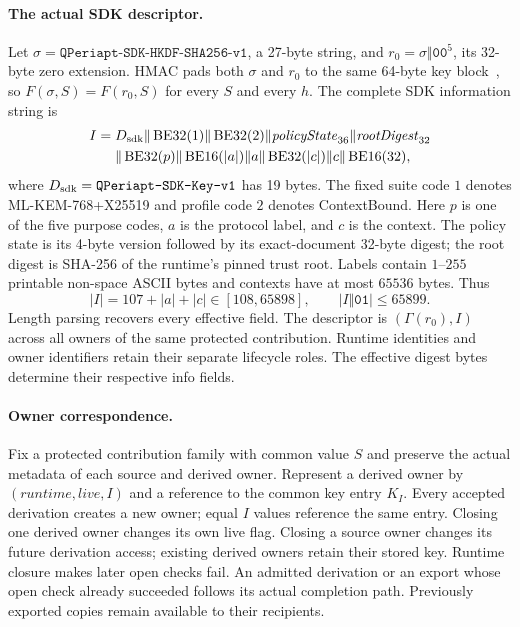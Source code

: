 \paragraph{The actual SDK descriptor.}
Let $\sigma=\texttt{QPeriapt-SDK-HKDF-SHA256-v1}$, a 27-byte string, and
$r_0=\sigma\Vert\mathtt{00}^5$, its 32-byte zero extension. HMAC pads both $\sigma$ and $r_0$ to the same
64-byte key block~\cite{rfc2104}, so $F(\sigma,S)=F(r_0,S)$ for every $S$ and every $h$.
The complete SDK information string is
\begin{equation}
\begin{split}
 I={}&D_{\rm sdk}\Vert\operatorname{BE32}(1)
 \Vert\operatorname{BE32}(2)\Vert\mathit{policyState}_{36}
 \Vert\mathit{rootDigest}_{32}\\
 &\Vert\operatorname{BE32}(p)
 \Vert\operatorname{BE16}(|a|)\Vert a
 \Vert\operatorname{BE32}(|c|)\Vert c
 \Vert\operatorname{BE16}(32),
\end{split}
 \label{eq:sdk-purpose-info}
\end{equation}
where $D_{\rm sdk}=\texttt{QPeriapt-SDK-Key-v1}$ has 19 bytes. The fixed
suite code $1$ denotes ML-KEM-768+X25519 and profile code $2$ denotes
ContextBound. Here $p$ is one
of the five purpose codes, $a$ is the protocol label, and $c$ is the context.
The policy state is its 4-byte version followed by its exact-document
32-byte digest; the root digest is SHA-256 of the runtime's pinned trust
root. Labels contain $1$--$255$ printable non-space ASCII bytes and contexts
have at most $65536$ bytes. Thus
\[
 |I|=107+|a|+|c|\in[108,65898],\qquad |I\Vert\mathtt{01}|\le65899.
\]
Length parsing recovers every effective field. The descriptor is
$(\Gamma(r_0),I)$ across all owners of the same protected contribution.
Runtime identities and owner identifiers retain their separate lifecycle
roles. The effective digest bytes determine their respective info fields.

\paragraph{Owner correspondence.}
Fix a protected contribution family with common value $S$ and preserve the
actual metadata of each source and derived owner. Represent a derived owner
by $(\mathit{runtime},\mathit{live},I)$ and a reference to the common key
entry $K_I$. Every accepted derivation creates a new owner; equal $I$ values
reference the same entry. Closing one derived owner changes its own live
flag. Closing a source owner changes its future derivation access; existing
derived owners retain their stored key. Runtime closure makes later open checks fail. An admitted derivation or an
export whose open check already succeeded follows its actual completion
path. Previously exported copies remain available to their recipients.

